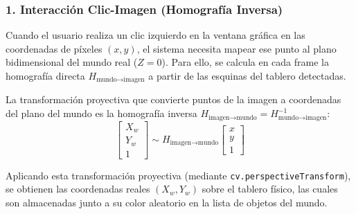 \documentclass[12pt,a4paper]{article}
\begin{document}
\subsubsection*{1. Interacción Clic-Imagen (Homografía Inversa)}
Cuando el usuario realiza un clic izquierdo en la ventana gráfica en las coordenadas de píxeles $(x, y)$, el sistema necesita mapear ese punto al plano bidimensional del mundo real ($Z=0$). Para ello, se calcula en cada frame la homografía directa $H_{\text{mundo} \to \text{imagen}}$ a partir de las esquinas del tablero detectadas.

La transformación proyectiva que convierte puntos de la imagen a coordenadas del plano del mundo es la homografía inversa $H_{\text{imagen} \to \text{mundo}} = H_{\text{mundo} \to \text{imagen}}^{-1}$:
\begin{equation}
    \begin{bmatrix} X_w \\ Y_w \\ 1 \end{bmatrix} \sim H_{\text{imagen} \to \text{mundo}} \begin{bmatrix} x \\ y \\ 1 \end{bmatrix}
\end{equation}

Aplicando esta transformación proyectiva (mediante \texttt{cv.perspectiveTransform}), se obtienen las coordenadas reales $(X_w, Y_w)$ sobre el tablero físico, las cuales son almacenadas junto a su color aleatorio en la lista de objetos del mundo.
\end{document}
